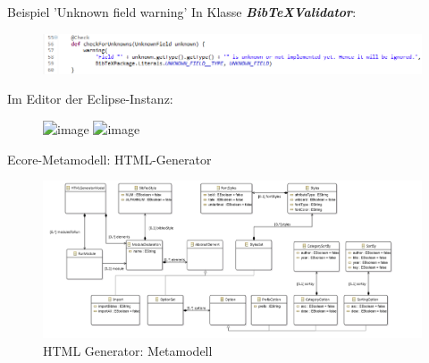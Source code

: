 \documentclass[fleqn,11pt,aspectratio=43]{beamer}
\begin{document}
\begin{frame}{Beispiel 'Unknown field warning'}
In Klasse \textbf{\it BibTeXValidator}:
\begin{figure}
\includegraphics[scale=0.5]{../validation_fragment.png} 
\end{figure} 

Im Editor der Eclipse-Instanz: 
\begin{figure}
\includegraphics<1>[scale=0.5]{../instance_unknownfield1.png} 
\includegraphics<2>[scale=0.5]{../instance_unknownfield2.png} 
\end{figure} 

\end{frame}

\begin{frame}{Ecore-Metamodell: HTML-Generator}
\begin{figure}
\includegraphics[scale=0.25]{../htmlgen_ecore.png} 
\caption{HTML Generator: Metamodell}
\end{figure}   
\end{frame}
\end{document}
